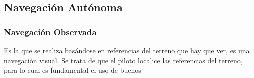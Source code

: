 







\subsection{Navegaci\'on Aut\'onoma}
\label{sec:06.navegacion.autonoma}

\subsubsection{Navegaci\'on Observada }%
\label{sec:06.navegacion.observada}

 Es la que se realiza bas\'andose en
referencias del terreno que hay que ver, es una navegaci\'on visual.
Se trata de que el piloto localice las referencias del terreno, para lo
cual es fundamental el uso de buenos 

